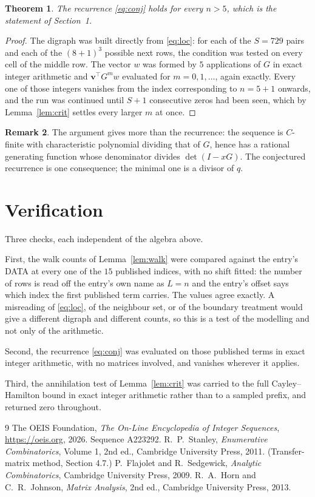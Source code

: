\documentclass[11pt,a4paper]{article}
\theoremstyle{plain}
\newtheorem{theorem}{Theorem}
\theoremstyle{definition}
\newtheorem{remark}[theorem]{Remark}
\begin{document}
\begin{theorem}
The recurrence \eqref{eq:conj} holds for every $n>5$, which is the statement of
Section~1.
\end{theorem}

\begin{proof}
The digraph was built directly from \eqref{eq:loc}: for each of the $S=729$ pairs and each
of the $(8+1)^{3}$ possible next rows, the condition was tested on every cell of
the middle row. The vector $w$ was formed by $5$ applications of $G$ in exact integer
arithmetic and $\mathbf{v}^{\!\top}G^{m}w$ evaluated for $m=0,1,\dots$, again exactly.
Every one of those integers vanishes from the index corresponding to $n=5+1$ onwards,
and the run was continued until $S+1$ consecutive zeros had been seen, which by
Lemma~\ref{lem:crit} settles every larger $m$ at once.
\end{proof}

\begin{remark}
The argument gives more than the recurrence: the sequence is $C$-finite with characteristic
polynomial dividing that of $G$, hence has a rational generating function whose denominator
divides $\det(I-xG)$. The conjectured recurrence is one consequence; the minimal one is a
divisor of $q$.
\end{remark}

\section{Verification}

Three checks, each independent of the algebra above.

First, the walk counts of Lemma~\ref{lem:walk} were compared against the entry's DATA at
every one of the $15$ published indices, with no shift fitted: the number of rows is
read off the entry's own name as $L=n$ and the entry's offset says which index the first
published term carries. The values agree exactly. A misreading of \eqref{eq:loc}, of the
neighbour set, or of the boundary treatment would give a different digraph and different
counts, so this is a test of the modelling and not only of the arithmetic.

Second, the recurrence \eqref{eq:conj} was evaluated on those published terms in exact
integer arithmetic, with no matrices involved, and vanishes wherever it applies.

Third, the annihilation test of Lemma~\ref{lem:crit} was carried to the full
Cayley--Hamilton bound in exact integer arithmetic rather than to a sampled prefix, and
returned zero throughout.

\begin{thebibliography}{9}
 The OEIS Foundation, \emph{The On-Line Encyclopedia of Integer
Sequences}, \url{https://oeis.org}, 2026. Sequence A223292.
 R.~P.~Stanley, \emph{Enumerative Combinatorics}, Volume 1, 2nd ed.,
Cambridge University Press, 2011. (Transfer-matrix method, Section 4.7.)
 P.~Flajolet and R.~Sedgewick, \emph{Analytic Combinatorics}, Cambridge
University Press, 2009.
 R.~A.~Horn and C.~R.~Johnson, \emph{Matrix Analysis}, 2nd ed., Cambridge
University Press, 2013.
\end{thebibliography}
\end{document}
